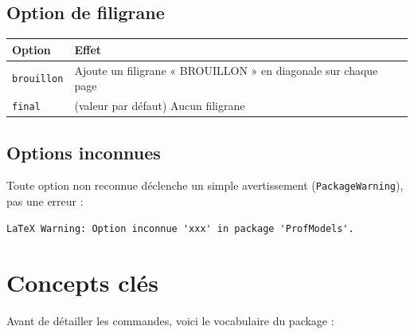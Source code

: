 \documentclass[11pt,a4paper]{article}
\begin{document}
\subsection{Option de filigrane}

\begin{center}
\begin{tabular}{@{}ll@{}}
\toprule
\textbf{Option} & \textbf{Effet} \\
\midrule
\texttt{brouillon} & Ajoute un filigrane « BROUILLON » en diagonale sur chaque page \\
\texttt{final} & (valeur par défaut) Aucun filigrane \\
\bottomrule
\end{tabular}
\end{center}

\subsection{Options inconnues}

Toute option non reconnue déclenche un simple avertissement (\texttt{PackageWarning}), pas une erreur :

\begin{lstlisting}
LaTeX Warning: Option inconnue 'xxx' in package 'ProfModels'.
\end{lstlisting}

\section{Concepts clés}

Avant de détailler les commandes, voici le vocabulaire du package :
\end{document}
